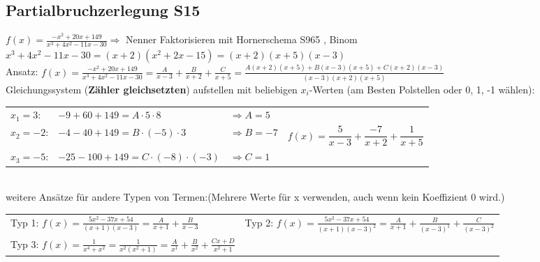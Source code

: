 	\subsection{Partialbruchzerlegung \color{red} S15}
\label{sub:allgemeines}



$f(x)= \frac{-x^{2}+20x+149}{x^{3}+4x^{2}-11x-30} \Rightarrow$ Nenner Faktorisieren mit Hornerschema \color{red} S965 \color{black}, Binom\\ $x^{3}+4x^{2}-11x-30=(x+2)(x^{2}+2x-15)=(x+2)(x+5)(x-3)$ \\
Ansatz: $ f(x)= \frac{-x^{2}+20x+149}{x^{3}+4x^{2}-11x-30}=\frac{A}{x-3}+\frac{B}{x+2}+\frac{C}{x+5}=\frac{A(x+2)(x+5)+B(x-3)(x+5)+C(x+2)(x-3)}{(x-3)(x+2)(x+5)} $\\

Gleichungssystem (\textbf{Zähler gleichsetzten}) aufstellen mit beliebigen $x_{i}$-Werten (am Besten Polstellen oder 0, 1, -1 wählen):\\
\begin{tabulary}{12cm}{llll}
	
	$x_{1}=3$: 		& $-9+60+149=A\cdot 5\cdot 8$ 			& 	$\Rightarrow A=5$ 	&		\\
	$x_{2}=-2$:		&  $-4-40+149=B\cdot(-5)\cdot 3$ 		& 	$\Rightarrow B=-7$	&	$f(x)=\dfrac{5}{x-3}+\dfrac{-7}{x+2}+\dfrac{1}{x+5}$		\\ 
	$x_{3}=-5$: 	&  $-25-100+149=C\cdot (-8)\cdot (-3)$ 	& 	$\Rightarrow C=1$	&			\\
	
\end{tabulary}\\

weitere Ansätze für andere Typen von Termen:(Mehrere Werte für x verwenden, auch wenn kein Koeffizient 0 wird.)\\
\begin{tabulary}{1\textwidth}{ll}
Typ 1: $f(x)=\frac{5x^{2}-37x+54}{(x+1)(x-3)}=\frac{A}{x+1}+\frac{B}{x-3}$ 
& 
Typ 2: $f(x)=\frac{5x^{2}-37x+54}{(x+1)(x-3)^{2}}=\frac{A}{x+1}+\frac{B}{(x-3)^{1}}+\frac{C}{(x-3)^{2}}$\\ 
Typ 3: $f(x)=\frac{1}{x^{4}+x^{2}} = \frac{1}{x^{2}(x^{2}+1)}= \frac{A}{x^{1}}+\frac{B}{x^{2}}+ \frac{Cx+D}{x^{2}+1}$
\end{tabulary}


